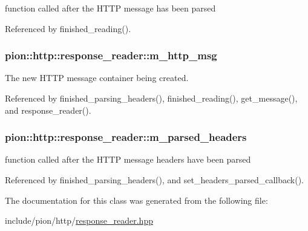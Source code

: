 function called after the H\-T\-T\-P message has been parsed 



Referenced by finished\-\_\-reading().

\hypertarget{classpion_1_1http_1_1response__reader_ac06fea6a8b6b5383dacd99c313b6f77d}{
\subsubsection[{m\-\_\-http\-\_\-msg}]{ pion\-::http\-::response\-\_\-reader\-::m\-\_\-http\-\_\-msg\hspace{0.3cm}{\ttfamily [protected]}}}\label{classpion_1_1http_1_1response__reader_ac06fea6a8b6b5383dacd99c313b6f77d}


The new H\-T\-T\-P message container being created. 



Referenced by finished\-\_\-parsing\-\_\-headers(), finished\-\_\-reading(), get\-\_\-message(), and response\-\_\-reader().

\hypertarget{classpion_1_1http_1_1response__reader_a1671bc073f332ea3c14a09af89c99c83}{
\subsubsection[{m\-\_\-parsed\-\_\-headers}]{ pion\-::http\-::response\-\_\-reader\-::m\-\_\-parsed\-\_\-headers\hspace{0.3cm}{\ttfamily [protected]}}}\label{classpion_1_1http_1_1response__reader_a1671bc073f332ea3c14a09af89c99c83}


function called after the H\-T\-T\-P message headers have been parsed 



Referenced by finished\-\_\-parsing\-\_\-headers(), and set\-\_\-headers\-\_\-parsed\-\_\-callback().



The documentation for this class was generated from the following file\-:\begin{DoxyCompactItemize}
\item 
include/pion/http/\hyperlink{response__reader_8hpp}{response\-\_\-reader.\-hpp}\end{DoxyCompactItemize}
